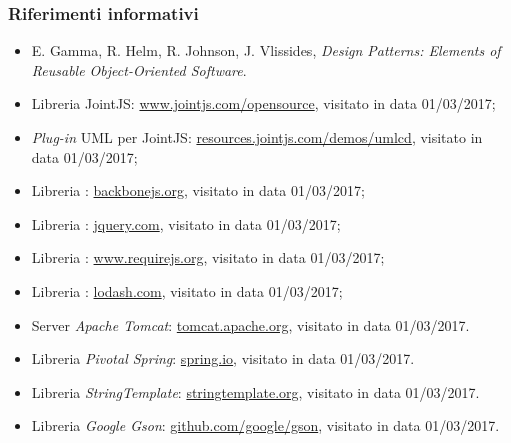 \subsubsection{Riferimenti informativi}
\begin{itemize}
	\item E. Gamma, R. Helm, R. Johnson, J. Vlissides, \emph{Design Patterns: Elements of Reusable Object-Oriented Software}.
	\item Libreria JointJS: \url{www.jointjs.com/opensource}, visitato in data 01/03/2017;
	\item \emph{Plug-in} UML per JointJS: \url{resources.jointjs.com/demos/umlcd}, visitato in data 01/03/2017;
	\item Libreria \backbonejs: \url{backbonejs.org}, visitato in data 01/03/2017;
	\item Libreria \jquery: \url{jquery.com}, visitato in data 01/03/2017;
	\item Libreria \requirejs: \url{www.requirejs.org}, visitato in data 01/03/2017;
	\item Libreria \lodash: \url{lodash.com}, visitato in data 01/03/2017;
	\item Server \emph{Apache Tomcat}: \url{tomcat.apache.org}, visitato in data 01/03/2017.
	\item Libreria \emph{Pivotal Spring}: \url{spring.io}, visitato in data 01/03/2017.
	\item Libreria \emph{StringTemplate}: \url{stringtemplate.org}, visitato in data 01/03/2017.
	\item Libreria \emph{Google Gson}: \url{github.com/google/gson}, visitato in data 01/03/2017.
\end{itemize}
